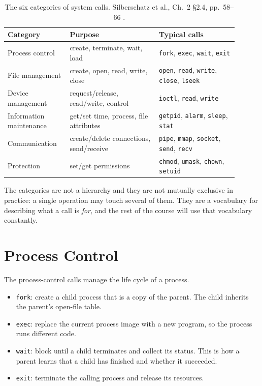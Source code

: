 \documentclass[11pt]{article}
\begin{document}
\begin{table}[h]
\centering
\small
\renewcommand{\arraystretch}{1.25}
\begin{tabular}{@{}>{\raggedright\arraybackslash}p{0.24\linewidth}>{\raggedright\arraybackslash}p{0.35\linewidth}>{\raggedright\arraybackslash}p{0.31\linewidth}@{}}
\toprule
\textbf{Category} & \textbf{Purpose} & \textbf{Typical calls} \\
\midrule
Process control & create, terminate, wait, load &
\texttt{fork}, \texttt{exec}, \texttt{wait}, \texttt{exit} \\
File management & create, open, read, write, close &
\texttt{open}, \texttt{read}, \texttt{write}, \texttt{close}, \texttt{lseek} \\
Device management & request/release, read/write, control &
\texttt{ioctl}, \texttt{read}, \texttt{write} \\
Information maintenance & get/set time, process, file attributes &
\texttt{getpid}, \texttt{alarm}, \texttt{sleep}, \texttt{stat} \\
Communication & create/delete connections, send/receive &
\texttt{pipe}, \texttt{mmap}, \texttt{socket}, \texttt{send}, \texttt{recv} \\
Protection & set/get permissions &
\texttt{chmod}, \texttt{umask}, \texttt{chown}, \texttt{setuid} \\
\bottomrule
\end{tabular}
\caption{The six categories of system calls. Silberschatz et al., Ch.~2
\S2.4, pp.~58--66 \cite{SilberschatzOSC_operating_system_concepts}.}
\label{tab:six-categories}
\end{table}

The categories are not a hierarchy and they are not mutually exclusive in
practice: a single operation may touch several of them. They are a vocabulary
for describing what a call is \emph{for}, and the rest of the course will use
that vocabulary constantly.

\section{Process Control}

The process-control calls manage the life cycle of a process.

\begin{itemize}
  \item \texttt{fork}: create a child process that is a copy of the parent.
        The child inherits the parent's open-file table.
  \item \texttt{exec}: replace the current process image with a new program,
        so the process runs different code.
  \item \texttt{wait}: block until a child terminates and collect its status.
        This is how a parent learns that a child has finished and whether it
        succeeded.
  \item \texttt{exit}: terminate the calling process and release its resources.
\end{itemize}
\end{document}
